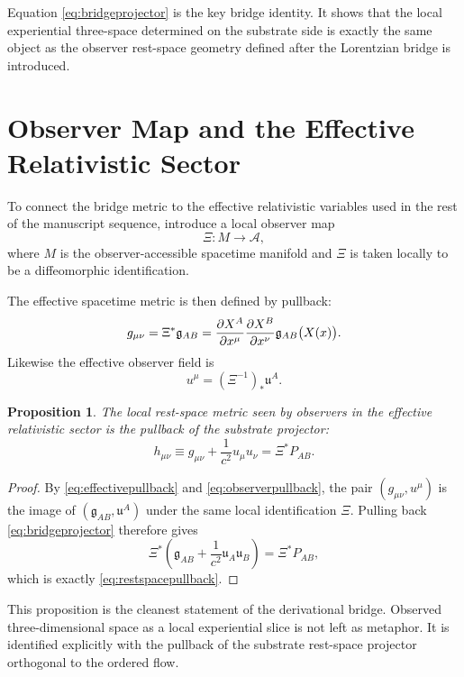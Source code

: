 \documentclass[11pt]{article}
\newcommand{\Sub}{\mathcal{A}}
\newcommand{\BridgeMetric}{\mathfrak{g}}
\newtheorem{proposition}{Proposition}
\begin{document}
Equation \eqref{eq:bridgeprojector} is the key bridge identity. It shows that the local experiential three-space determined on the substrate side is exactly the same object as the observer rest-space geometry defined after the Lorentzian bridge is introduced.

\section{Observer Map and the Effective Relativistic Sector}

To connect the bridge metric to the effective relativistic variables used in the rest of the manuscript sequence, introduce a local observer map
\[
\Xi:M \to \Sub,
\]
where \(M\) is the observer-accessible spacetime manifold and \(\Xi\) is taken locally to be a diffeomorphic identification.

The effective spacetime metric is then defined by pullback:
\begin{equation}
g_{\mu\nu}
=
\Xi^* \BridgeMetric_{AB}
=
\pdv{X^A}{x^\mu}\pdv{X^B}{x^\nu}\BridgeMetric_{AB}\bigl(X(x)\bigr).
\label{eq:effectivepullback}
\end{equation}
Likewise the effective observer field is
\begin{equation}
u^\mu = (\Xi^{-1})_* \mathfrak u^A.
\label{eq:observerpullback}
\end{equation}

\begin{proposition}
The local rest-space metric seen by observers in the effective relativistic sector is the pullback of the substrate projector:
\begin{equation}
h_{\mu\nu}
\equiv
g_{\mu\nu}
+
\frac{1}{c^2}u_\mu u_\nu
=
\Xi^* P_{AB}.
\label{eq:restspacepullback}
\end{equation}
\end{proposition}

\begin{proof}
By \eqref{eq:effectivepullback} and \eqref{eq:observerpullback}, the pair \((g_{\mu\nu},u^\mu)\) is the image of \((\BridgeMetric_{AB},\mathfrak u^A)\) under the same local identification \(\Xi\). Pulling back \eqref{eq:bridgeprojector} therefore gives
\[
\Xi^*\!\left(
\BridgeMetric_{AB}
+
\frac{1}{c^2}\mathfrak u_A \mathfrak u_B
\right)
=
\Xi^* P_{AB},
\]
which is exactly \eqref{eq:restspacepullback}.
\end{proof}

This proposition is the cleanest statement of the derivational bridge. Observed three-dimensional space as a local experiential slice is not left as metaphor. It is identified explicitly with the pullback of the substrate rest-space projector orthogonal to the ordered flow.
\end{document}
